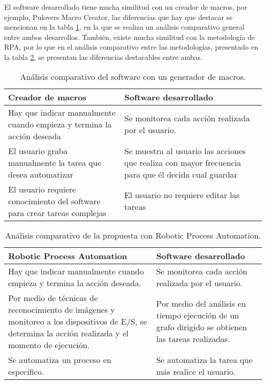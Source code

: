 El software desarrollado tiene mucha similitud con un creador de macros, por 
 ejemplo, Pulovers Macro Creator, las diferencias que hay que destacar se 
 mencionan en la tabla \ref{vsmacros}, en la que se realiza un an\'alisis 
 comparativo general entre ambos desarrollos. Tambi\'en, existe mucha 
 similitud con la metodolog\'ia de RPA, por lo que en el an\'alisis 
 comparativo entre las metodolog\'ias, presentado en la tabla \ref{vsrpa}, se 
 presentan las diferencias destacables entre ambas.
 

\begin{table}[h]
\centering
\begin{tabular}{m{6cm}|m{6cm}}
\hline
Creador de macros 	&	Software desarrollado \\
\hline
Hay que indicar manualmente cuando empieza y termina la acci\'on deseada	
 &	
Se monitorea cada acci\'on realizada por el usuario.\\
\hline

El usuario graba manualmente la tarea que desea automatizar	
 &
Se muestra al usuario las acciones que realiza con mayor frecuencia para que
  \'el decida cual guardar\\
\hline

El usuario requiere conocimiento del software para crear tareas complejas 	
 &
El usuario no requiere editar las tareas\\
\hline
\end{tabular}
\caption{An\'alisis comparativo del software con un generador de macros.}
\label{vsmacros}
\end{table}


\begin{table}[h]
\centering
\begin{tabular}{m{6cm}|m{6cm}}
\hline
Robotic Process Automation    &    Software desarrollado \\

\hline
Hay que indicar manualmente cuando empieza y termina la acci\'on deseada.
&
Se monitorea cada acci\'on realizada por el usuario.\\

\hline
Por medio de t\'ecnicas de reconocimiento de im\'agenes y monitoreo a los dispositivos de E/S, se determina la acci\'on realizada y el momento de ejecuci\'on. 
&
Por medio del an\'alisis en tiempo ejecuci\'on de un grafo dirigido se obtienen las tareas realizadas.\\

\hline
Se automatiza un proceso en espec\'ifico.
&
Se automatiza la tarea que m\'as realice el usuario.\\

\hline
\end{tabular}
\caption{An\'alisis comparativo de la propuesta con Robotic Process
 Automation.}
\label{vsrpa}
\end{table}


